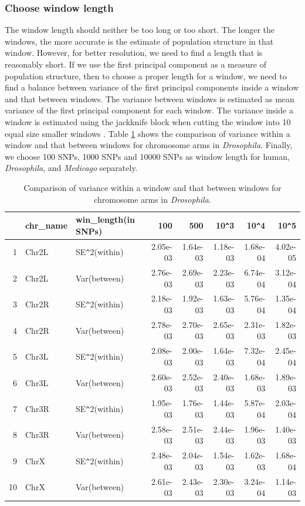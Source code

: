 \documentclass[11pt, oneside]{article}   	%
\begin{document}
\subsubsection{Choose window length}
The window length should neither be too long or too short. The longer the windows, the more accurate is the estimate of population structure in that window. However, for better resolution, we need to find a length that is reasonably short. If we use the first principal component as a measure of population structure, then to choose a proper length for a
window, we need to find a balance between variance of the first principal components inside a window and that between windows. The variance between windows is estimated as mean variance of the first principal component for each window. The variance inside a window is estimated using the jackknife block when cutting the window into 10 equal size smaller windows \cite{efron1982jackknife}. Table \ref{tab:window_sizes} shows the comparison of variance within a window and that between windows for chromosome arms in \textit{Drosophila}. Finally, we choose 100 SNPs, 1000 SNPs and 10000 SNPs as window length for human, \textit{Drosophila}, and \textit{Medicago} separately.



\begin{table}[ht]
\centering
\begin{tabular}{rllrrrrr}
  \hline
 & chr\_name & win\_length(in SNPs) & 100 & 500 & 10\verb|^|3 & 10\verb|^|4 & 10\verb|^|5 \\ 
  \hline
1 & Chr2L & SE\verb|^|2(within) & 2.05e-03 & 1.64e-03 & 1.18e-03 & 1.68e-04 & 4.02e-05 \\ 
  2 & Chr2L & Var(between) & 2.76e-03 & 2.69e-03 & 2.23e-03 & 6.74e-04 & 3.12e-04 \\ 
  3 & Chr2R & SE\verb|^|2(within) & 2.18e-03 & 1.92e-03 & 1.63e-03 & 5.76e-04 & 1.35e-04 \\ 
  4 & Chr2R & Var(between) & 2.78e-03 & 2.70e-03 & 2.65e-03 & 2.31e-03 & 1.82e-03 \\ 
  5 & Chr3L & SE\verb|^|2(within) & 2.08e-03 & 2.00e-03 & 1.64e-03 & 7.32e-04 & 2.45e-04 \\ 
  6 & Chr3L & Var(between) & 2.60e-03 & 2.52e-03 & 2.40e-03 & 1.68e-03 & 1.89e-03 \\ 
  7 & Chr3R & SE\verb|^|2(within) & 1.95e-03 & 1.76e-03 & 1.44e-03 & 5.87e-04 & 2.03e-04 \\ 
  8 & Chr3R & Var(between) & 2.58e-03 & 2.51e-03 & 2.44e-03 & 1.96e-03 & 1.40e-03 \\ 
  9 & ChrX & SE\verb|^|2(within) & 2.48e-03 & 2.04e-03 & 1.54e-03 & 1.62e-03 & 1.68e-04 \\ 
  10 & ChrX & Var(between) & 2.61e-03 & 2.43e-03 & 2.30e-03 & 3.24e-04 & 1.14e-03 \\ 
   \hline
\end{tabular}
\caption{
Comparison of variance within a window and that between windows for chromosome arms in \textit{Drosophila}.
} \label{tab:window_sizes}
\end{table}
\end{document}
